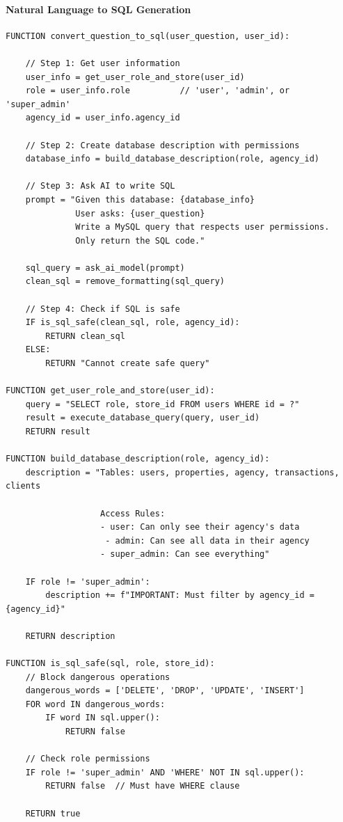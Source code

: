 \paragraph{Natural Language to SQL Generation}
\begin{verbatim}
FUNCTION convert_question_to_sql(user_question, user_id):
    
    // Step 1: Get user information
    user_info = get_user_role_and_store(user_id)
    role = user_info.role          // 'user', 'admin', or 'super_admin'
    agency_id = user_info.agency_id
    
    // Step 2: Create database description with permissions
    database_info = build_database_description(role, agency_id)
    
    // Step 3: Ask AI to write SQL
    prompt = "Given this database: {database_info}
              User asks: {user_question}
              Write a MySQL query that respects user permissions.
              Only return the SQL code."
    
    sql_query = ask_ai_model(prompt)
    clean_sql = remove_formatting(sql_query)
    
    // Step 4: Check if SQL is safe
    IF is_sql_safe(clean_sql, role, agency_id):
        RETURN clean_sql
    ELSE:
        RETURN "Cannot create safe query"

FUNCTION get_user_role_and_store(user_id):
    query = "SELECT role, store_id FROM users WHERE id = ?"
    result = execute_database_query(query, user_id)
    RETURN result

FUNCTION build_database_description(role, agency_id):
    description = "Tables: users, properties, agency, transactions, clients
                   
                   Access Rules:
                   - user: Can only see their agency's data
                    - admin: Can see all data in their agency  
                   - super_admin: Can see everything"
    
    IF role != 'super_admin':
        description += f"IMPORTANT: Must filter by agency_id = {agency_id}"
    
    RETURN description

FUNCTION is_sql_safe(sql, role, store_id):
    // Block dangerous operations
    dangerous_words = ['DELETE', 'DROP', 'UPDATE', 'INSERT']
    FOR word IN dangerous_words:
        IF word IN sql.upper():
            RETURN false
    
    // Check role permissions
    IF role != 'super_admin' AND 'WHERE' NOT IN sql.upper():
        RETURN false  // Must have WHERE clause
    
    RETURN true
\end{verbatim}

